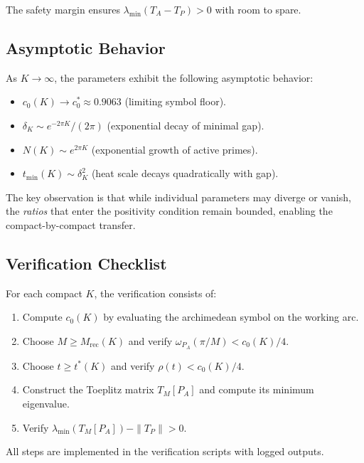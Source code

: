 \noindent The safety margin ensures $\lambda_{\min}(T_A - T_P) > 0$ with room to spare.

\subsection{Asymptotic Behavior}

As $K \to \infty$, the parameters exhibit the following asymptotic behavior:

\begin{itemize}
  \item $c_0(K) \to c_0^* \approx 0.9063$ (limiting symbol floor).
  \item $\delta_K \sim e^{-2\pi K}/(2\pi)$ (exponential decay of minimal gap).
  \item $N(K) \sim e^{2\pi K}$ (exponential growth of active primes).
  \item $t_{\min}(K) \sim \delta_K^2$ (heat scale decays quadratically with gap).
\end{itemize}

The key observation is that while individual parameters may diverge or vanish, the \emph{ratios} that enter the positivity condition remain bounded, enabling the compact-by-compact transfer.

\subsection{Verification Checklist}

For each compact $K$, the verification consists of:

\begin{enumerate}
  \item Compute $c_0(K)$ by evaluating the archimedean symbol on the working arc.
  \item Choose $M \geq M_{\mathrm{rec}}(K)$ and verify $\omega_{P_A}(\pi/M) < c_0(K)/4$.
  \item Choose $t \geq t^*(K)$ and verify $\rho(t) < c_0(K)/4$.
  \item Construct the Toeplitz matrix $T_M[P_A]$ and compute its minimum eigenvalue.
  \item Verify $\lambda_{\min}(T_M[P_A]) - \|T_P\| > 0$.
\end{enumerate}

All steps are implemented in the verification scripts with logged outputs.
